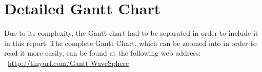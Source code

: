 \documentclass[12pt,letterpaper]{article}
\begin{document}





  \tableofcontents


\newpage
\setlength{\parskip}{12pt}



 \clearpage









\newpage
\appendix

\appendixpage
\addappheadtotoc

 \newpage
 \newpage
\section{Detailed Gantt Chart}
\label{sec:detailedGantt}
Due to its complexity, the Gantt chart had to be separated in order to include it in this report. The complete Gantt Chart, which can be zoomed into in order to read it more easily, can be found at the following web address: ~\url{http://tinyurl.com/Gantt-WaveSphere}
\end{document}
